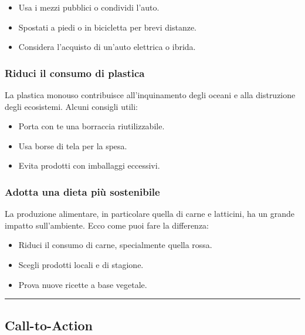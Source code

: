 \documentclass[
]{antposter}
\providecommand{\tightlist}{%
  \setlength{\itemsep}{0pt}\setlength{\parskip}{0pt}}
\begin{document}
\begin{itemize}
\tightlist
\item
  Usa i mezzi pubblici o condividi l'auto.
\item
  Spostati a piedi o in bicicletta per brevi distanze.
\item
  Considera l'acquisto di un'auto elettrica o ibrida.
\end{itemize}

\subsubsection{Riduci il consumo di
plastica}\label{riduci-il-consumo-di-plastica}

La plastica monouso contribuisce all'inquinamento degli oceani e alla
distruzione degli ecosistemi. Alcuni consigli utili:

\begin{itemize}
\tightlist
\item
  Porta con te una borraccia riutilizzabile.
\item
  Usa borse di tela per la spesa.
\item
  Evita prodotti con imballaggi eccessivi.
\end{itemize}

\subsubsection{Adotta una dieta più
sostenibile}\label{adotta-una-dieta-piuxf9-sostenibile}

La produzione alimentare, in particolare quella di carne e latticini, ha
un grande impatto sull'ambiente. Ecco come puoi fare la differenza:

\begin{itemize}
\tightlist
\item
  Riduci il consumo di carne, specialmente quella rossa.
\item
  Scegli prodotti locali e di stagione.
\item
  Prova nuove ricette a base vegetale.
\end{itemize}

\begin{center}\rule{0.5\linewidth}{0.5pt}\end{center}

\subsection{Call-to-Action}\label{call-to-action}
\end{document}
